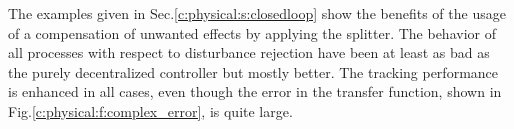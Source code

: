 The examples given in Sec.\ref{c:physical:s:closedloop} show the benefits of the usage of a compensation of unwanted effects by applying the splitter. The behavior of all processes with respect to disturbance rejection have been at least as bad as the purely decentralized controller but mostly better. The tracking performance is enhanced in all cases, even though the error in the transfer function, shown in Fig.\ref{c:physical:f:complex_error}, is quite large.\\
